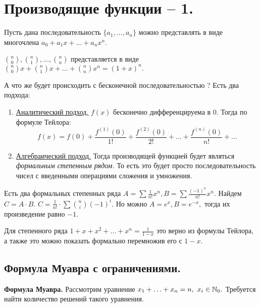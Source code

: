 \section{Производящие функции -- 1.}

\begin{definition}
    Пусть дана последовательность $\{a_1, \ldots, a_n\}$ можно представлять в виде многочлена $a_0 + a_1x + \ldots + a_nx^n.$
\end{definition}

\begin{example}
   $\binom{n}{0}, \binom{n}{1}, \ldots, \binom{n}{n}$ представляется в виде $\binom{n}{0}x + \binom{n}{1} x + \ldots + \binom{n}{n} x ^ n = (1 + x) ^ n.$
\end{example}

А что же будет происходить с бесконечной последовательностью ?
Есть два подхода:
\begin{enumerate}
    \item \underline{Аналитический подход.} $f(x)$ бесконечно дифференцируема в $0.$ Тогда по формуле Тейлора:
    $$f(x) = f(0) + \frac{f^{(1)}(0)}{1!} + \frac{f^{(2)}(0)}{2!} + \ldots + \frac{f^{(n)}(0)}{n!} + \ldots$$
    \item \underline{Алгебраический подход.} Тогда производящей функцией будет являться \textit{формальным степенным рядом.} То есть это будет просто последовательность чисел с введенными операциями сложения и умножения.
\end{enumerate}

\begin{example}
    Есть два формальных степенных ряда $A = \sum \frac{1}{n!}x^n, B = \sum \frac{(-1)^n}{n!}x^n.$ Найдем $C = A \cdot B.$
    $C = \frac{1}{n!} \cdot \sum \binom{n}{i} (-1)^i.$
    Но можно $A = e^x, B = e^{-x},$ тогда их произведение равно $-1.$
\end{example}

\begin{example}
    Для степенного ряда $1 + x + x^2 + \ldots + x^n = \frac{1}{1 - x}$ это верно из формулы Тейлора, а также это можно показать формально перемножив его с $1 - x.$ 
\end{example}

\subsection{Формула Муавра с ограничениями.}

\begin{problem}
    \textbf{Формула Муавра.} Рассмотрим уравнение $x_1 + \ldots + x_n = n, \ x_i \in \mathbb{N}_{0}.$ Требуется найти количество решений такого уравнения.
\end{problem}

